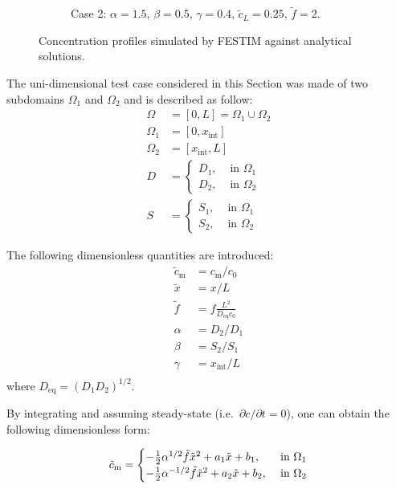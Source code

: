 \begin{figure} [h]
\begin{subfigure}{0.5\linewidth}
        \caption{Case 2:  $\alpha = 1.5$, $\beta = 0.5$, $\gamma=0.4$, $\tilde{c}_L = 0.25$, $\tilde{f}=2$.}
    \end{subfigure}
    \caption{Concentration profiles simulated by FESTIM against analytical solutions.}
\end{figure}

The uni-dimensional test case considered in this Section was made of two subdomains $\Omega_1$ and $\Omega_2$ and is described as follow:
\begin{subequations}
\begin{align}
    \Omega &= [0, L] = \Omega_1 \cup \Omega_2 \\
    \Omega_1 &= [0, x_\mathrm{int}] \\
    \Omega_2 &= [x_\mathrm{int}, L] \\
    D &= \begin{cases}
        D_1,& \text{ in } \Omega_1\\
        D_2,& \text{ in } \Omega_2
    \end{cases} \\
    S &= \begin{cases}
        S_1,& \text{ in } \Omega_1\\
        S_2,& \text{ in } \Omega_2
    \end{cases}
\end{align}
\end{subequations}

The following dimensionless quantities are introduced:
\begin{subequations}
    \begin{align}
        \tilde{c}_\mathrm{m} &= c_\mathrm{m} / c_0\\
        \tilde{x} &= x / L \\
        \tilde{f} &= f \frac{L^2}{D_\mathrm{eq} c_0} \\
        \alpha &= D_2/D_1 \\
        \beta &= S_2/S_1 \\
        \gamma &= x_\mathrm{int}/L\\
    \end{align} 
\end{subequations}
where $D_\mathrm{eq} = (D_1 D_2)^{1/2}$.

By integrating  and assuming steady-state (i.e.\ $\partial c/\partial t=0$), one can obtain the following dimensionless form:

\begin{equation}
        \tilde{c}_\mathrm{m}= 
\begin{cases}
    -\frac{1}{2}\alpha^{1/2}\tilde{f} \tilde{x}^2 + a_1 \tilde{x} + b_1,& \text{ in } \Omega_1\\
    -\frac{1}{2}\alpha^{-1/2}\tilde{f} \tilde{x}^2 + a_2 \tilde{x} + b_2,& \text{ in } \Omega_2
\end{cases}
\labeq{MES c}
\end{equation}

